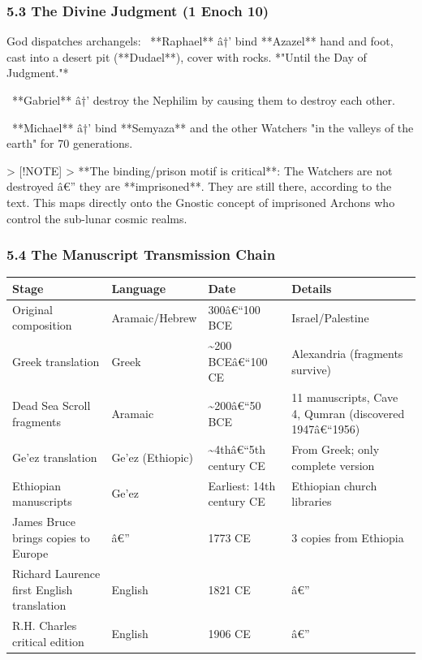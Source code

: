 \documentclass[aps,prd,11pt,onecolumn,superscriptaddress,nofootinbib,floatfix]{revtex4-2}
\begin{document}
\subsubsection{5.3 The Divine Judgment (1 Enoch 10)}


God dispatches archangels:
\textbullet~**Raphael** â†' bind **Azazel** hand and foot, cast into a desert pit (**Dudael**), cover with rocks. *"Until the Day of Judgment."*

\textbullet~**Gabriel** â†' destroy the Nephilim by causing them to destroy each other.

\textbullet~**Michael** â†' bind **Semyaza** and the other Watchers "in the valleys of the earth" for 70 generations.



> [!NOTE]
> **The binding/prison motif is critical**: The Watchers are not destroyed â€'' they are **imprisoned**. They are still there, according to the text. This maps directly onto the Gnostic concept of imprisoned Archons who control the sub-lunar cosmic realms.


\subsubsection{5.4 The Manuscript Transmission Chain}


\begin{table}[h!]
\centering
\begin{tabular}{p{3cm}p{3cm}p{3cm}p{3cm}}
\hline
Stage & Language & Date & Details \\
\hline
Original composition & Aramaic/Hebrew & 300â€``100 BCE & Israel/Palestine \\
Greek translation & Greek & \textasciitilde{}200 BCEâ€``100 CE & Alexandria (fragments survive) \\
Dead Sea Scroll fragments & Aramaic & \textasciitilde{}200â€``50 BCE & 11 manuscripts, Cave 4, Qumran (discovered 1947â€``1956) \\
Ge'ez translation & Ge'ez (Ethiopic) & \textasciitilde{}4thâ€``5th century CE & From Greek; only complete version \\
Ethiopian manuscripts & Ge'ez & Earliest: 14th century CE & Ethiopian church libraries \\
James Bruce brings copies to Europe & â€'' & 1773 CE & 3 copies from Ethiopia \\
Richard Laurence first English translation & English & 1821 CE & â€'' \\
R.H. Charles critical edition & English & 1906 CE & â€'' \\
\hline
\end{tabular}
\end{table}
\end{document}
